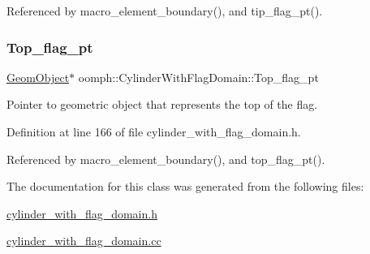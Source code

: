 Referenced by macro\+\_\+element\+\_\+boundary(), and tip\+\_\+flag\+\_\+pt().

\mbox{\label{classoomph_1_1CylinderWithFlagDomain_a92ae4556f99335233c1c653e15fa1f48}} 
\subsubsection{\texorpdfstring{Top\+\_\+flag\+\_\+pt}{Top\_flag\_pt}}
{\footnotesize\ttfamily \hyperlink{classoomph_1_1GeomObject}{Geom\+Object}$\ast$ oomph\+::\+Cylinder\+With\+Flag\+Domain\+::\+Top\+\_\+flag\+\_\+pt\hspace{0.3cm}{\ttfamily [private]}}



Pointer to geometric object that represents the top of the flag. 



Definition at line 166 of file cylinder\+\_\+with\+\_\+flag\+\_\+domain.\+h.



Referenced by macro\+\_\+element\+\_\+boundary(), and top\+\_\+flag\+\_\+pt().



The documentation for this class was generated from the following files\+:\begin{DoxyCompactItemize}
\item 
\hyperlink{cylinder__with__flag__domain_8h}{cylinder\+\_\+with\+\_\+flag\+\_\+domain.\+h}\item 
\hyperlink{cylinder__with__flag__domain_8cc}{cylinder\+\_\+with\+\_\+flag\+\_\+domain.\+cc}\end{DoxyCompactItemize}
